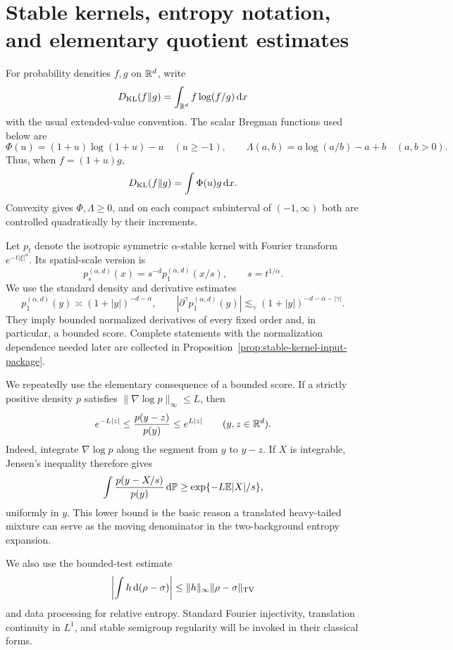 \section{Stable kernels, entropy notation, and elementary quotient estimates}
\label{sec:stable-kernel-preliminaries}

For probability densities \(f,g\) on \(\mathbb{R}^d\), write
\[
 D_{\rm KL}(f\|g)=\int_{\mathbb{R}^d}f\log(f/g)\,\mathrm{d} x
\]
with the usual extended-value convention.  The scalar Bregman functions used
below are
\[
 \Phi(u)=(1+u)\log(1+u)-u\quad(u\ge-1),
 \qquad
 \Lambda(a,b)=a\log(a/b)-a+b\quad(a,b>0).
\]
Thus, when \(f=(1+u)g\),
\[
 D_{\rm KL}(f\|g)=\int\Phi(u)g\,\mathrm{d} x.
\]
Convexity gives \(\Phi,\Lambda\ge0\), and on each compact subinterval of
\((-1,\infty)\) both are controlled quadratically by their increments.

Let \(p_t\) denote the isotropic symmetric \(\alpha\)-stable kernel with
Fourier transform \(e^{-t|\xi|^\alpha}\).  Its spatial-scale version is
\[
 p_s^{(\alpha,d)}(x)=s^{-d}p_1^{(\alpha,d)}(x/s),
 \qquad s=t^{1/\alpha}.
\]
We use the standard density and derivative estimates
\begin{equation}\label{eq:prelim-stable-density-derivatives}
 p_1^{(\alpha,d)}(y)\asymp(1+|y|)^{-d-\alpha},
 \qquad
 |\partial^\gamma p_1^{(\alpha,d)}(y)|
 \lesssim_\gamma(1+|y|)^{-d-\alpha-|\gamma|}.
\end{equation}
They imply bounded normalized derivatives of every fixed order and, in
particular, a bounded score.  Complete statements with the normalization
dependence needed later are collected in
Proposition~\ref{prop:stable-kernel-input-package}.

We repeatedly use the elementary consequence of a bounded score.  If a
strictly positive density \(p\) satisfies
\(\|\nabla\log p\|_\infty\le L\), then
\begin{equation}\label{eq:prelim-quotient-exponential-bound}
 e^{-L|z|}\le \frac{p(y-z)}{p(y)}\le e^{L|z|}
 \qquad(y,z\in\mathbb{R}^d).
\end{equation}
Indeed, integrate \(\nabla\log p\) along the segment from \(y\) to
\(y-z\).  If \(X\) is integrable, Jensen's inequality therefore gives
\begin{equation}\label{eq:prelim-mixture-lower-bound}
 \int\frac{p(y-X/s)}{p(y)}\,\mathrm{d}\mathbb P
 \ge \exp\{-L\mathbb{E}|X|/s\},
\end{equation}
uniformly in \(y\).  This lower bound is the basic reason a translated
heavy-tailed mixture can serve as the moving denominator in the
two-background entropy expansion.

We also use the bounded-test estimate
\begin{equation}\label{eq:prelim-bounded-test}
 \left|\int h\,\mathrm{d}(\rho-\sigma)\right|
 \le \|h\|_\infty\|\rho-\sigma\|_{\rm TV}
\end{equation}
and data processing for relative entropy.  Standard Fourier injectivity,
translation continuity in \(L^1\), and stable semigroup regularity will be
invoked in their classical forms.
